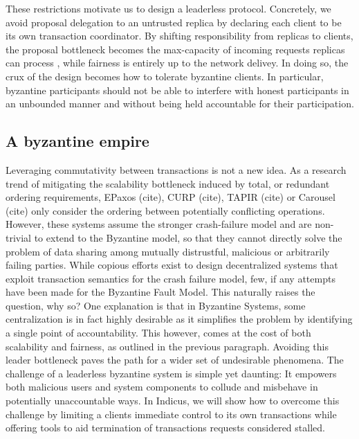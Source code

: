 These restrictions motivate us to design a leaderless protocol. Concretely, we avoid proposal delegation to an untrusted replica by declaring each client to be its own transaction coordinator.
By shifting responsibility from replicas to clients, the proposal bottleneck becomes the max-capacity of incoming requests replicas can process , while fairness is entirely up to the network delivey. In doing so, the crux of the design becomes how to tolerate byzantine clients. In particular, byzantine participants should not be able to interfere with honest participants in an unbounded manner and without being held accountable for their participation. 



\subsection{A byzantine empire}
Leveraging commutativity between transactions is not a new idea. As a research trend of mitigating the scalability bottleneck induced by total, or redundant ordering requirements, EPaxos (cite), CURP (cite), TAPIR (cite) or Carousel (cite) only consider the ordering between potentially conflicting operations. However, these systems assume the stronger crash-failure model and are non-trivial to extend to the Byzantine model, so that they cannot directly solve the problem of data sharing among mutually distrustful, malicious or arbitrarily failing parties.
While copious efforts exist to design decentralized systems that exploit transaction semantics for the crash failure model, few, if any attempts have been made for the Byzantine Fault Model. This naturally raises the question, why so? One explanation is that in Byzantine Systems, some centralization is in fact highly desirable as it simplifies the problem by identifying a single point of accountability. This however, comes at the cost of both scalability and fairness, as outlined in the previous paragraph.  Avoiding this leader bottleneck paves the path for a wider set of undesirable phenomena. The challenge of a leaderless byzantine system is simple yet daunting: It empowers both malicious users and system components to collude and misbehave in potentially unaccountable ways. 
In Indicus, we will show how to overcome this challenge by limiting a clients immediate control to its own transactions while offering tools to aid termination of transactions requests considered stalled.

